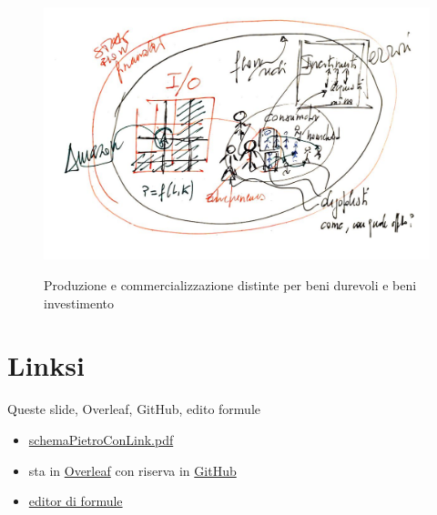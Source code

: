 \documentclass[]{beamer}
\begin{document}
\begin{frame}{~} %



\begin{figure}[H]
\center
\includegraphics[scale=0.50]{7.pdf}
\label{7}
\caption{Produzione e commercializzazione distinte per beni durevoli e beni investimento}
\end{figure}

\end{frame}

\section{Linksi}

\begin{frame}{Queste slide, Overleaf, GitHub, edito formule}

\begin{itemize}

\item
\href{https://terna.to.it/ejmmp/deposito/schemaPietroConLink.pdf}{schemaPietroConLink.pdf}

\item
sta in \href{https://it.overleaf.com/4892961924fddsgrqnbwhh}{Overleaf} con riserva in \href{https://github.com/terna/ejmmpSchemaPietro}{GitHub}

\item
\href{https://editor.codecogs.com}{editor di formule}

\end{itemize}


\end{frame}
\end{document}
